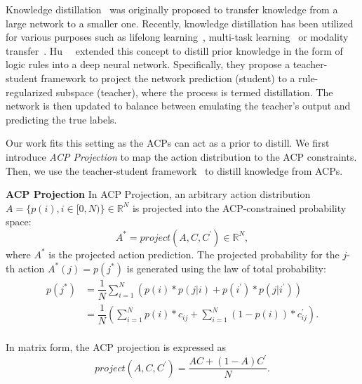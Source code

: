 Knowledge distillation~\cite{hinton2015distilling} was originally proposed to transfer knowledge from a large network to a smaller one. 
Recently, knowledge distillation has been utilized for various purposes such as lifelong learning~\cite{li2016learning}, multi-task learning~\cite{kim2018disjoint} or modality transfer~\cite{cho2021dealing,hoffman2016learning}.
Hu~\etal~\cite{hu2016harnessing} extended this concept to distill prior knowledge in the form of logic rules into a deep neural network. Specifically, they propose a teacher-student framework to project the network prediction (student) to a rule-regularized subspace (teacher), where the process is termed distillation. 
The network is then updated to balance between emulating the teacher's output and predicting the true labels.


Our work fits this setting as
the ACPs can act as a prior to distill. 
We first introduce \emph{ACP Projection} to map the action distribution to the ACP constraints. Then, we use the teacher-student framework~\cite{hu2016harnessing} to distill knowledge from ACPs.

\noindent\textbf{ACP Projection} In ACP Projection, an arbitrary action distribution 
$A = \{p(i), i \in [0, N)\} \in \mathbb{R}^{ N}$
is projected into the ACP-constrained probability space:
\begin{equation}
A^{*} = project(A, C, C^{'}) \in \mathbb{R}^{N},
\end{equation}
where $A^{*}$ is the projected action prediction. The projected probability for the $j$-th action $A^{*}(j) = p(j^{*})$ is generated using the law of total probability:
\begin{equation}
    \begin{split}
    p(j^{*}) & =\dfrac{1}{N}\sum_{i=1}^{N} (p(i) * p(j|i) + p(i^{'}) * p(j|i^{'})) \\
& = \dfrac{1}{N} (\sum_{i=1}^{N} p(i) * c_{ij} + \sum_{i=1}^{N} (1-p(i)) * c_{ij}^{'}). \\
    \end{split}
\end{equation}


In matrix form, the ACP projection is expressed as
\begin{equation}
project(A, C, C^{'}) = \dfrac{AC + (1-A)C^{'}}{N}.
\end{equation}



